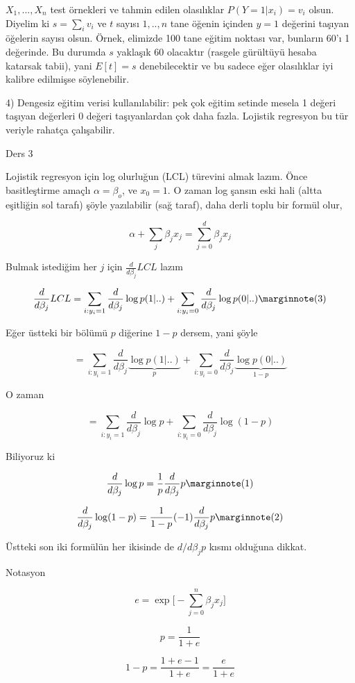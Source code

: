\documentclass[12pt,fleqn]{article}\usepackage{../../common}
\begin{document}
$X_1,...,X_n$ test örnekleri ve tahmin edilen olasılıklar $P(Y=1 | x_i) = v_i$ 
olsun. Diyelim ki $s = \sum_i v_i$ ve $t$ sayısı $1,..,n$ tane öğenin
içinden $y = 1$ değerini taşıyan öğelerin sayısı olsun. Örnek, elimizde 100
tane eğitim noktası var, bunların 60'ı 1 değerinde. Bu durumda $s$ yaklaşık
60 olacaktır (rasgele gürültüyü hesaba katarsak tabii), yani  $E[t] = s$ 
denebilecektir ve bu sadece eğer olasılıklar iyi kalibre edilmişse
söylenebilir.

4) Dengesiz eğitim verisi kullanılabilir: pek çok eğitim setinde mesela 1
değeri taşıyan değerleri 0 değeri taşıyanlardan çok daha fazla. Lojistik
regresyon bu tür veriyle rahatça çalışabilir.
 
Ders 3

Lojistik regresyon için log olurluğun (LCL) türevini almak lazım. Önce
basitleştirme amaçlı $\alpha = \beta_o$, ve $x_0 = 1$. O zaman log şansın
eski hali (altta eşitliğin sol tarafı) şöyle yazılabilir (sağ taraf), daha
derli toplu bir formül olur,

$$ \alpha + \sum_j \beta_j x_j  = \sum_{j=0}^{d} \beta_j x_j $$ 

Bulmak istediğim her $j$ için $\frac{d}{d\beta_j} LCL$ lazım

$$ 
\frac{d}{d\beta_j} LCL = 
\sum_{i:y_i=1} \frac{d}{d\beta_j} \log p(1|..)
+ \sum_{i:y_i=0} \frac{d}{d\beta_j} \log p(0|..)
\mlabel{3}
$$

Eğer üstteki bir bölümü $p$ diğerine $1-p$ dersem, yani şöyle

$$ 
= \sum_{i:y_i=1} \frac{d}{d\beta_j} \underbrace{\log p(1|..)}_{p}
+ \sum_{i:y_i=0} \frac{d}{d\beta_j} \underbrace{\log p(0|..)}_{1-p}
$$

O zaman 


$$ 
= \sum_{i:y_i=1} \frac{d}{d\beta_j}\log p
+ \sum_{i:y_i=0} \frac{d}{d\beta_j} \log (1-p)
$$

Biliyoruz ki

$$ 
\frac{d}{d\beta_j}\log p = \frac{1}{p}\frac{d}{d\beta_j} p
\mlabel{1}
$$

$$ 
\frac{d}{d\beta_j}\log (1-p) = \frac{1}{1-p}(-1)\frac{d}{d\beta_j} p
\mlabel{2}
$$

Üstteki son iki formülün her ikisinde de $d/d\beta_j p$ kısmı olduğuna dikkat.

Notasyon

$$ e = \exp \big[ - \sum_{j=0}^n \beta_jx_j \big] $$

$$ p = \frac{ 1}{1+e} $$

$$ 1-p = \frac{ 1+e-1}{1+e} = \frac{ e}{1+e} $$
\end{document}
